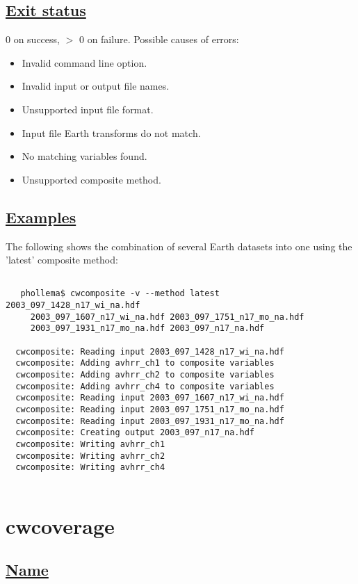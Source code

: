 \subsection*{\underline{Exit status}}


  0 on success, $>$ 0 on failure. Possible causes of errors:
\begin{itemize}
\item  Invalid command line option. 
\item  Invalid input or output file names. 
\item  Unsupported input file format. 
\item  Input file Earth transforms do not match. 
\item  No matching variables found. 
\item  Unsupported composite method. 

\end{itemize}
\subsection*{\underline{Examples}}


  The following shows the combination of several Earth datasets into one using the 'latest' composite method:
\begin{verbatim}

   phollema$ cwcomposite -v --method latest 2003_097_1428_n17_wi_na.hdf
     2003_097_1607_n17_wi_na.hdf 2003_097_1751_n17_mo_na.hdf
     2003_097_1931_n17_mo_na.hdf 2003_097_n17_na.hdf

  cwcomposite: Reading input 2003_097_1428_n17_wi_na.hdf
  cwcomposite: Adding avhrr_ch1 to composite variables
  cwcomposite: Adding avhrr_ch2 to composite variables
  cwcomposite: Adding avhrr_ch4 to composite variables
  cwcomposite: Reading input 2003_097_1607_n17_wi_na.hdf
  cwcomposite: Reading input 2003_097_1751_n17_mo_na.hdf
  cwcomposite: Reading input 2003_097_1931_n17_mo_na.hdf
  cwcomposite: Creating output 2003_097_n17_na.hdf
  cwcomposite: Writing avhrr_ch1
  cwcomposite: Writing avhrr_ch2
  cwcomposite: Writing avhrr_ch4
 
\end{verbatim}

\newpage
\section{cwcoverage} \hypertarget{cwcoverage}{}
\subsection*{\underline{Name}}


